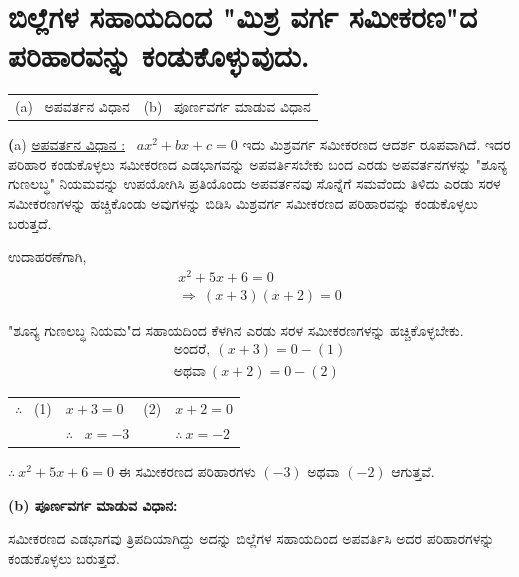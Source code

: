 \section*{ಬಿಲ್ಲೆಗಳ ಸಹಾಯದಿಂದ "ಮಿಶ್ರ ವರ್ಗ ಸಮೀಕರಣ"ದ ಪರಿಹಾರವನ್ನು ಕಂಡು\break ಕೊಳ್ಳುವುದು.}

\noindent
\begin{tabular}{@{}ll}
(a)~  ಅಪವರ್ತನ ವಿಧಾನ & (b)~ ಪೂರ್ಣವರ್ಗ ಮಾಡುವ ವಿಧಾನ
\end{tabular}

\smallskip
\noindent
{\textbf(a) {\underline{ಅಪವರ್ತನ ವಿಧಾನ :}}}~ $ax^2 + bx + c = 0$ ಇದು ಮಿಶ್ರವರ್ಗ ಸಮೀಕರಣದ ಆದರ್ಶ ರೂಪವಾಗಿದೆ. ಇದರ ಪರಿಹಾರ ಕಂಡುಕೊಳ್ಳಲು ಸಮೀಕರಣದ ಎಡಭಾಗವನ್ನು ಅಪವರ್ತಿಸಬೇಕು ಬಂದ ಎರಡು ಅಪವರ್ತನಗಳನ್ನು "ಶೂನ್ಯ ಗುಣಲಬ್ಧ" ನಿಯಮವನ್ನು ಉಪಯೋಗಿಸಿ ಪ್ರತಿಯೊಂದು ಅಪವರ್ತನವು ಸೊನ್ನೆಗೆ ಸಮವೆಂದು ತಿಳಿದು ಎರಡು ಸರಳ ಸಮೀಕರಣಗಳನ್ನು ಹಚ್ಚಿಕೊಂಡು ಅವುಗಳನ್ನು ಬಿಡಿಸಿ ಮಿಶ್ರವರ್ಗ ಸಮೀಕರಣದ ಪರಿಹಾರವನ್ನು ಕಂಡುಕೊಳ್ಳಲು ಬರುತ್ತದೆ. 

ಉದಾಹರಣೆಗಾಗಿ, 
\begin{gather*}
x^2 + 5x + 6 = 0\\
\Rightarrow~ (x+3)(x+2) = 0
\end{gather*}

"ಶೂನ್ಯ ಗುಣಲಬ್ಧ ನಿಯಮ"ದ ಸಹಾಯದಿಂದ ಕೆಳಗಿನ ಎರಡು ಸರಳ ಸಮೀಕರಣಗಳನ್ನು ಹಚ್ಚಿಕೊಳ್ಳಬೇಕು.
\begin{gather*}
\text{ಅಂದರೆ},~ (x+3) = 0 -(1) \\
\text{ಅಥವಾ}~ (x+2) = 0 -(2) 
\end{gather*}

\begin{tabular}{llll}
$\therefore$~ (1) & $x + 3 = 0$ & (2) & $x+2 = 0$\\
& $\therefore$~ $x = -3$ & &$\therefore~ x = -2$
\end{tabular}

$\therefore~ x^2 + 5x + 6 = 0$ ಈ ಸಮೀಕರಣದ ಪರಿಹಾರಗಳು $(-3)$ ಅಥವಾ $(-2)$ ಆಗುತ್ತವೆ.

\newpage
\eject

\noindent 
\textbf{(b) ಪೂರ್ಣವರ್ಗ ಮಾಡುವ ವಿಧಾನ:}

ಸಮೀಕರಣದ ಎಡಭಾಗವು ತ್ರಿಪದಿಯಾಗಿದ್ದು ಅದನ್ನು ಬಿಲ್ಲೆಗಳ ಸಹಾಯದಿಂದ ಅಪ\-ವರ್ತಿಸಿ ಅದರ ಪರಿಹಾರಗಳನ್ನು ಕಂಡುಕೊಳ್ಳಲು ಬರುತ್ತದೆ. 

